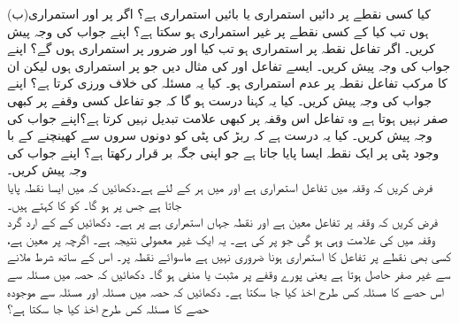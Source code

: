 (ب)\quad  کیا کسی نقطے پر  دائیں استمراری یا بائیں استمراری ہے؟
اگر  پر  اور  استمراری ہوں تب کیا  کے کسی نقطے پر  غیر استمراری ہو سکتا ہے؟ اپنے جواب کی وجہ پیش کریں۔
اگر تفاعل  نقطہ  پر استمراری ہو تب کیا  اور  ضرور  پر استمراری ہوں گے؟ اپنے جواب کی وجہ پیش کریں۔
ایسے تفاعل  اور  کی مثال دیں جو  پر استمراری ہوں لیکن ان کا مرکب تفاعل  نقطہ  پر عدم استمراری ہو۔ کیا یہ مسئلہ  کی خلاف ورزی کرتا ہے؟ اپنے جواب کی وجہ پیش کریں۔
کیا یہ کہنا درست ہو گا کہ جو تفاعل کسی وقفے پر کبھی صفر نہیں ہوتا ہے وہ تفاعل اس وقفہ پر کبھی علامت تبدیل نہیں کرتا ہے؟اپنے جواب کی وجہ پیش کریں۔
کیا یہ درست ہے کہ ربڑ کی پٹی کو دونوں سروں سے کھینچنے کے با وجود پٹی پر ایک نقطہ ایسا پایا جاتا ہے جو اپنی جگہ بر قرار رکھتا ہے؟ اپنے جواب کی وجہ پیش کریں۔
\\
فرض کریں کہ وقفہ  میں تفاعل  استمراری ہے اور  میں ہر  کے لئے  ہے۔دکھائیں کہ  میں ایسا نقطہ  پایا جاتا ہے جس پر  ہو گا۔  کو  کا  کہتے ہیں۔
\\
فرض کریں کہ وقفہ  پر تفاعل  معین ہے اور نقطہ  جہاں  استمراری ہے پر   ہے۔ دکھائیں کے  کے ارد گرد وقفہ  میں  کی علامت وہی ہو گی جو  پر  کی ہے۔ یہ ایک غیر معمولی نتیجہ ہے۔ اگرچہ  پر  معین ہے، کسی بھی نقطے پر تفاعل کا استمراری ہونا ضروری نہیں ہے ماسوائے نقطہ  پر۔ اس کے ساتھ شرط  ملانے سے  غیر صفر حاصل ہوتا ہے یعنی پورے وقفے پر  مثبت یا منفی ہو گا۔
دکھائیں کہ حصہ  میں مسئلہ  سے اس حصے کا مسئلہ  کس طرح اخذ کیا جا سکتا ہے۔ 
دکھائیں کہ حصہ  میں مسئلہ  اور مسئلہ  سے موجودہ حصے کا مسئلہ  کس طرح اخذ کیا جا سکتا ہے؟

